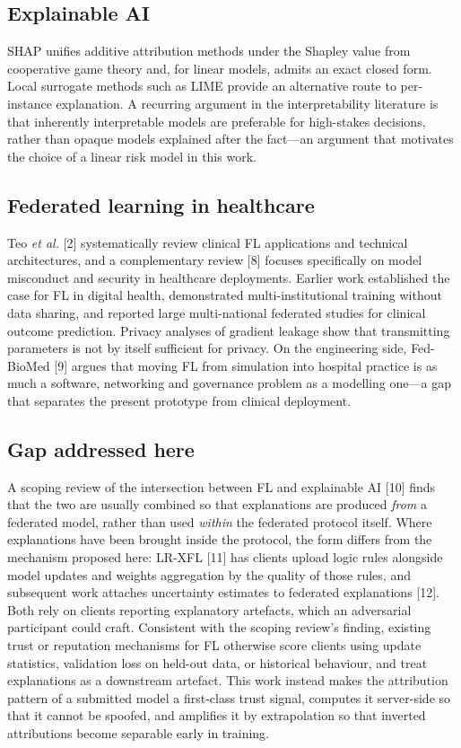 \documentclass[10pt,twocolumn,letterpaper]{article}
\begin{document}
\subsection{Explainable AI}
SHAP unifies additive attribution methods under the Shapley value from
cooperative game theory and, for linear models, admits an exact closed form.
Local surrogate methods such as LIME provide an alternative route to
per-instance explanation. A recurring argument in the interpretability
literature is that inherently interpretable models are preferable for
high-stakes decisions, rather than opaque models explained after the fact---an
argument that motivates the choice of a linear risk model in this work.

\subsection{Federated learning in healthcare}
Teo \emph{et al.} [2] systematically review clinical FL
applications and technical architectures, and a complementary review
[8] focuses specifically on model misconduct and security
in healthcare deployments. Earlier work established the case
for FL in digital health, demonstrated multi-institutional training without
data sharing, and reported large multi-national federated studies for clinical
outcome prediction. Privacy analyses of gradient leakage show that
transmitting parameters is not by itself sufficient for privacy. On the engineering side, Fed-BioMed
[9] argues that moving FL from simulation into
hospital practice is as much a software, networking and governance problem as
a modelling one---a gap that separates the present prototype from clinical
deployment.

\subsection{Gap addressed here}
A scoping review of the intersection between FL and explainable AI
[10] finds that the two are usually combined so that
explanations are produced \emph{from} a federated model, rather than used
\emph{within} the federated protocol itself. Where explanations have been
brought inside the protocol, the form differs from the mechanism proposed
here: LR-XFL [11] has clients upload logic rules alongside
model updates and weights aggregation by the quality of those rules, and
subsequent work attaches uncertainty estimates to federated explanations
[12]. Both rely on clients reporting explanatory
artefacts, which an adversarial participant could craft. Consistent with the
scoping review's finding, existing trust or reputation mechanisms for FL
otherwise score clients using update statistics, validation loss on held-out
data, or historical behaviour, and treat explanations as a downstream
artefact. This
work instead makes the attribution pattern of a submitted model a first-class
trust signal, computes it server-side so that it cannot be spoofed, and
amplifies it by extrapolation so that inverted attributions become
separable early in training.
\end{document}

